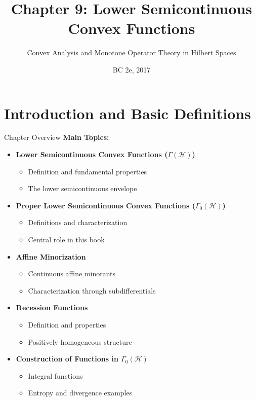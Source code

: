 \documentclass[aspectratio=169,10pt]{beamer}
\title{Chapter 9: Lower Semicontinuous Convex Functions}
\subtitle{Convex Analysis and Monotone Operator Theory in Hilbert Spaces}
\author{BC 2e, 2017}
\date{}
\begin{document}
\frame{\titlepage}

\section{Introduction and Basic Definitions}

\begin{frame}[allowframebreaks]{Chapter Overview}
\textbf{Main Topics:}
\begin{itemize}
    \item \textbf{Lower Semicontinuous Convex Functions ($\Gamma(\mathcal{H})$)}
        \begin{itemize}
            \item Definition and fundamental properties
            \item The lower semicontinuous envelope
        \end{itemize}
    \item \textbf{Proper Lower Semicontinuous Convex Functions ($\Gamma_0(\mathcal{H})$)}
        \begin{itemize}
            \item Definitions and characterization
            \item Central role in this book
        \end{itemize}
    \item \textbf{Affine Minorization}
        \begin{itemize}
            \item Continuous affine minorants
            \item Characterization through subdifferentials
        \end{itemize}
    \item \textbf{Recession Functions}
        \begin{itemize}
            \item Definition and properties
            \item Positively homogeneous structure
        \end{itemize}
    \item \textbf{Construction of Functions in $\Gamma_0(\mathcal{H})$}
        \begin{itemize}
            \item Integral functions
            \item Entropy and divergence examples
        \end{itemize}
\end{itemize}
\end{frame}
\end{document}
